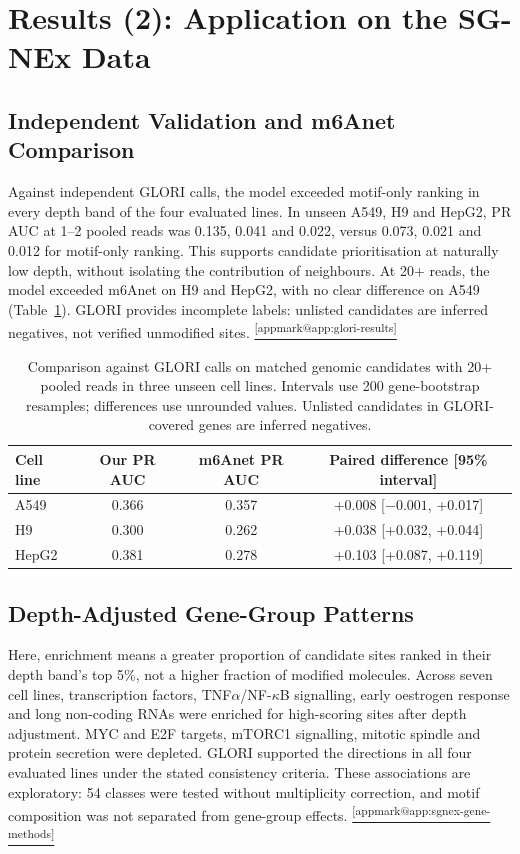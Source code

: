 \documentclass[11pt,a4paper]{article}
\makeatletter
\DeclareRobustCommand{\applink}[1]{%
    \hyperref[#1]{\textsuperscript{\ref*{appmark@#1}}}}
\makeatother
\begin{document}
\section{Results (2): Application on the SG-NEx Data}
\label{sec:sgnex-results}
\subsection{Independent Validation and m6Anet Comparison}
Against independent GLORI calls, the model exceeded motif-only ranking in
every depth band of the four evaluated lines. In unseen A549, H9 and HepG2,
PR AUC at 1--2 pooled reads was 0.135, 0.041 and 0.022, versus 0.073, 0.021
and 0.012 for motif-only ranking. This supports candidate prioritisation at
naturally low depth, without isolating the contribution of neighbours.
At 20+ reads, the model exceeded m6Anet on H9 and HepG2, with no clear
difference on A549 (Table~\ref{tab:glori-main}). GLORI provides incomplete
labels: unlisted candidates are inferred negatives, not verified unmodified
sites.\applink{app:glori-results}

\begin{table}[H]
\centering\small
\begin{tabular}{lccc}
\toprule
\textbf{Cell line} & \textbf{Our PR AUC} & \textbf{m6Anet PR AUC} & \textbf{Paired difference [95\% interval]} \\
\midrule
A549 & 0.366 & 0.357 & +0.008 [$-0.001$, +0.017] \\
H9 & 0.300 & 0.262 & +0.038 [+0.032, +0.044] \\
HepG2 & 0.381 & 0.278 & +0.103 [+0.087, +0.119] \\
\bottomrule
\end{tabular}
\caption{Comparison against GLORI calls on matched genomic candidates with
20+ pooled reads in three unseen cell lines. Intervals use 200 gene-bootstrap
resamples; differences use unrounded values. Unlisted candidates in
GLORI-covered genes are inferred negatives.}
\label{tab:glori-main}
\end{table}

\subsection{Depth-Adjusted Gene-Group Patterns}
Here, enrichment means a greater proportion of candidate sites ranked in
their depth band's top 5\%, not a higher fraction of modified molecules.
Across seven cell lines, transcription factors, TNF$\alpha$/NF-$\kappa$B
signalling, early oestrogen response and long non-coding RNAs were enriched
for high-scoring sites after depth adjustment. MYC and E2F targets, mTORC1
signalling, mitotic spindle and protein secretion were depleted. GLORI
supported the directions in all four evaluated lines under the stated
consistency criteria. These associations are exploratory: 54 classes were
tested without multiplicity correction, and motif composition was not
separated from gene-group effects.\applink{app:sgnex-gene-methods}
\end{document}
